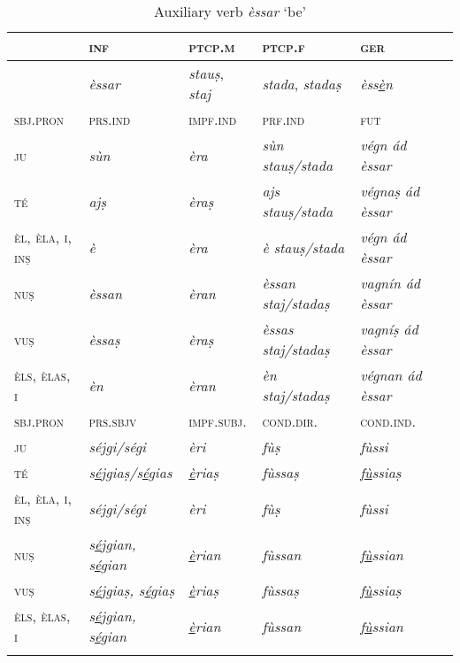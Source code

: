 \begin{table}
	\caption{Auxiliary verb \textit{èssar} `be'}
	\label{tab:aux:èssar}
	\begin{tabular}{llllll}
		\lsptoprule
		& \textsc{inf}  & \textsc{ptcp.m}  & \textsc{ptcp.f}  &  \textsc{ger}\\
		\midrule
		&\textit{èssar} &\textit{stauṣ}, \textit{staj}  & \textit{stada}, \textit{stadaṣ} & \textit{èss\underline{è}n}\\
		\lsptoprule
	\textsc{sbj.pron} 	&\textsc{prs.ind}  &\textsc{impf.ind} & \textsc{prf.ind} & \textsc{fut}\\
		\midrule
		\textsc{ju} &\textit{sùn} & \textit{èra} &\textit{sùn stauṣ/stada} &\textit{végn ád èssar}\\
		\textsc{té} &\textit{ajṣ} &\textit{èraṣ} &\textit{ajs stauṣ/stada} & \textit{végnaṣ ád èssar}\\
		\textsc{èl, èla, i, inṣ} &\textit{è} & \textit{èra} & \textit{è stauṣ/stada} &\textit{végn ád èssar}\\
		\textsc{nuṣ} &\textit{èssan} &\textit{èran} & \textit{èssan staj/stadaṣ} &\textit{vagnín ád èssar}\\
		\textsc{vuṣ} &\textit{èssaṣ} & \textit{èraṣ} & \textit{èssas staj/stadaṣ} &\textit{vagníṣ ád èssar}\\
		\textsc{èls, èlas, i}& \textit{èn} & \textit{èran} & \textit{èn staj/stadaṣ} & \textit{végnan ád èssar}\\
		\lsptoprule
		\textsc{sbj.pron}    &\textsc{prs.sbjv} & \textsc{impf.subj.}  &\textsc{cond.dir.} & \textsc{cond.ind.}\\
		\midrule
		\textsc{ju} & \textit{séjgi/ségi} & \textit{èri} & \textit{fùṣ} & \textit{fùssi}\\
		\textsc{té} & \textit{s\underline{é}jgiaṣ/s\underline{é}gias} & \textit{\underline{è}riaṣ} & \textit{fùssaṣ} & \textit{f\underline{ù}ssiaṣ}\\
		\textsc{èl, èla, i, inṣ} & \textit{séjgi/ségi} & \textit{èri} & \textit{fùṣ} & \textit{fùssi}\\
		\textsc{nuṣ} & \textit{s\underline{é}jgian, s\underline{é}gian} & \textit{\underline{è}rian} & \textit{fùssan} & \textit{f\underline{ù}ssian}\\
		\textsc{vuṣ} &  \textit{s\underline{é}jgiaṣ, s\underline{é}giaṣ} &  \textit{\underline{è}riaṣ} & \textit{fùssaṣ} & \textit{f\underline{ù}ssiaṣ}\\
		\textsc{èls, èlas, i} & \textit{s\underline{é}jgian, s\underline{é}gian} & \textit{\underline{è}rian} & \textit{fùssan} & \textit{f\underline{ù}ssian}\\
		\lspbottomrule
	\end{tabular}
\end{table}

